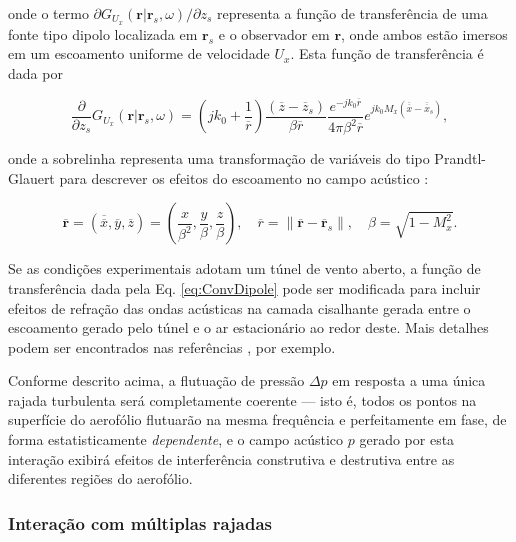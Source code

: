\documentclass[a4paper, 11pt, twoside]{article}
\providecommand{\norm}[1]{\lVert#1\rVert}
\begin{document}
\noindent onde o termo $\partial G_{U_x}(\mathbf{r} | \mathbf{r}_s, \omega) / \partial z_s$ representa a função de transferência de uma fonte tipo dipolo localizada em $\mathbf{r}_s$ e o observador em $\mathbf{r}$, onde ambos estão imersos em um escoamento uniforme de velocidade $U_x$. Esta função de transferência é dada por

\begin{equation}
	\frac{\partial}{\partial z_s} G_{U_x} (\mathbf{r} | \mathbf{r}_s, \omega) = \left(jk_0 + \frac{1}{\overline{r}} \right) \frac{\left(\overline{z}-\overline{z}_s \right)}{\beta \overline{r}}  \frac{e^{-j k_0 \overline{r}}}{4 \pi \beta^2 \overline{r}} e^{j k_0 M_x \left( \overline{\overline{x}} - \overline{\overline{x}}_s \right)},
	\label{eq:ConvDipole}
\end{equation}

\noindent onde a sobrelinha representa uma transformação de variáveis do tipo Prandtl-Glauert para descrever os efeitos do escoamento no campo acústico \cite{Chapman00}:

\begin{equation}
	\overline{\mathbf{r}} = \left( \overline{\overline{x}}, \overline{y}, \overline{z} \right) = \left( \frac{x}{\beta^2}, \frac{y}{\beta}, \frac{z}{\beta} \right), \quad \overline{r} = \norm{\overline{\mathbf{r}} - \overline{\mathbf{r}}_s}, \quad \beta = \sqrt{1-M_x^2}.
	\label{eq:ChapmanTransformedVariables}
\end{equation}

Se as condições experimentais adotam um túnel de vento aberto, a função de transferência dada pela Eq. \ref{eq:ConvDipole} pode ser modificada para incluir efeitos de refração das ondas acústicas na camada cisalhante gerada entre o escoamento gerado pelo túnel e o ar estacionário ao redor deste. Mais detalhes podem ser encontrados nas referências \cite{Casagrande18, Casagrande_etal2020}, por exemplo.

Conforme descrito acima, a flutuação de pressão $\Delta p$ em resposta a uma única rajada turbulenta será completamente coerente --- isto é, todos os pontos na superfície do aerofólio flutuarão na mesma frequência e perfeitamente em fase, de forma estatisticamente \emph{dependente}, e o campo acústico $p$ gerado por esta interação exibirá efeitos de interferência construtiva e destrutiva entre as diferentes regiões do aerofólio.

\subsubsection{Interação com múltiplas rajadas}
\end{document}
